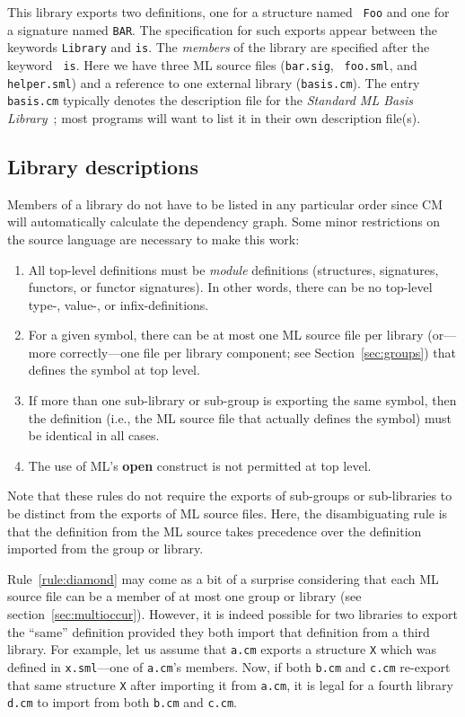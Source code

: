 \documentclass{article}
\begin{document}
This library exports two definitions, one for a structure named {\tt
Foo} and one for a signature named {\tt BAR}.  The specification for
such exports appear between the keywords {\tt Library} and {\tt is}.
The {\em members} of the library are specified after the keyword {\tt
is}.  Here we have three ML source files ({\tt bar.sig}, {\tt
foo.sml}, and {\tt helper.sml}) and a reference to one external
library ({\tt basis.cm}).  The entry {\tt basis.cm} typically denotes
the description file for the {\it Standard ML Basis
Library}~\cite{reppy99:basis}; most programs will want to list it in
their own description file(s).

\subsection{Library descriptions}

Members of a library do not have to be listed in any particular order
since CM will automatically calculate the dependency graph.  Some
minor restrictions on the source language are necessary to make this
work:
\begin{enumerate}
\item All top-level definitions must be {\em module} definitions
(structures, signatures, functors, or functor signatures).  In other
words, there can be no top-level type-, value-, or infix-definitions.
\item For a given symbol, there can be at most one ML source file per
library (or---more correctly---one file per library component; see
Section~\ref{sec:groups}) that defines the symbol at top level.
\item If more than one sub-library or sub-group is exporting the same
symbol, then the definition (i.e., the ML source file that actually
defines the symbol) must be identical in all cases.
\label{rule:diamond}
\item The use of ML's {\bf open} construct is not permitted at top
level.
\end{enumerate}

Note that these rules do not require the exports of sub-groups or
sub-libraries to be distinct from the exports of ML source files.
Here, the disambiguating rule is that the definition from the ML
source takes precedence over the definition imported from the group or
library.

Rule~\ref{rule:diamond} may come as a bit of a surprise considering
that each ML source file can be a member of at most one group or
library (see section~\ref{sec:multioccur}).  However, it is indeed
possible for two libraries to export the ``same'' definition provided
they both import that definition from a third library.  For example,
let us assume that {\tt a.cm} exports a structure {\tt X} which was
defined in {\tt x.sml}---one of {\tt a.cm}'s members.  Now, if both
{\tt b.cm} and {\tt c.cm} re-export that same structure {\tt X} after
importing it from {\tt a.cm}, it is legal for a fourth library {\tt
d.cm} to import from both {\tt b.cm} and {\tt c.cm}.
\end{document}
